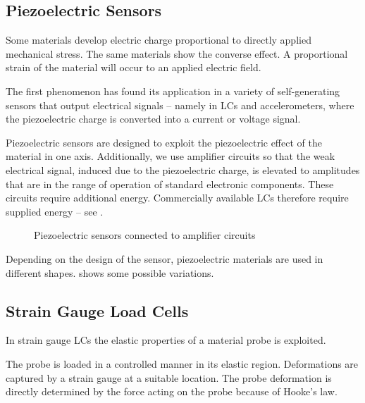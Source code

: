 \subsection{Piezoelectric Sensors}
Some materials develop electric charge proportional to directly applied mechanical stress. The same materials show the converse effect. A proportional strain of the material will occur to an applied electric field.

The first phenomenon has found its application in a variety of self-generating sensors that output electrical signals -- namely in \ac{LC}s and accelerometers, where the piezoelectric charge is converted into a current or voltage signal.

Piezoelectric sensors are designed to exploit the piezoelectric effect of the material in one axis. Additionally, we use amplifier circuits so that the weak electrical signal, induced due to the piezoelectric charge, is elevated to amplitudes that are in the range of operation of standard electronic components. These circuits require additional energy. Commercially available \ac{LC}s therefore require supplied energy -- see .

\begin{figure}[!htb]
    \centering
    \hspace{4em}
    \caption[Piezoelectric sensors in amplifier circuits \cite{webster2018measurement}]{Piezoelectric sensors connected to amplifier circuits \cite{webster2018measurement}}
    \label{fig:piezo_ampcirc}
\end{figure}

Depending on the design of the sensor, piezoelectric materials are used in different shapes.  shows some possible variations.


\subsection{Strain Gauge Load Cells}

In strain gauge \ac{LC}s the elastic properties of a material probe is exploited.

The probe is loaded in a controlled manner in its elastic region. Deformations are captured by a strain gauge at a suitable location. The probe deformation is directly determined by the force acting on the probe because of Hooke's law.


